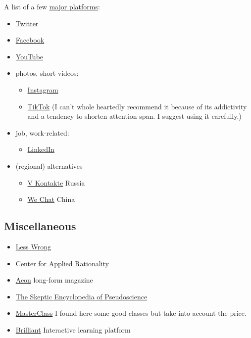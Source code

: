 \documentclass{article}
\begin{document}
A list of a few \href{https://www.visualcapitalist.com/ranked-social-networks-worldwide-by-users/}{major platforms}:
\begin{itemize}
    \item \href{https://twitter.com/?lang=en}{Twitter}
    \item \href{https://www.facebook.com/}{Facebook}
    \item \href{https://www.youtube.com/}{YouTube}
    \item photos, short videos:
    \begin{itemize}
        \item \href{https://www.instagram.com/?hl=en}{Instagram}
        \item \href{https://www.tiktok.com/en/}{TikTok} (I can't whole heartedly recommend it because of its addictivity and a tendency to shorten attention span. I suggest using it carefully.)
    \end{itemize}
    \item job, work-related:
    \begin{itemize}
        \item \href{https://www.linkedin.com/}{LinkedIn}
    \end{itemize}
    \item (regional) alternatives
    \begin{itemize}
        \item \href{https://vk.com/?lang=en}{V Kontakte} Russia
        \item \href{https://www.wechat.com/}{We Chat} China
    \end{itemize}
\end{itemize}


\subsection{Miscellaneous}

\begin{itemize}
    \item \href{https://www.lesswrong.com/}{Less Wrong}
    \item \href{https://rationality.org/}{Center for Applied Rationality}
    \item \href{https://aeon.co/}{Aeon} long-form magazine
    \item \href{https://www.goodreads.com/book/show/656073.The_Skeptic_Encyclopedia_of_Pseudoscience}{The Skeptic Encyclopedia of Pseudoscience}
    \item \href{https://www.masterclass.com/}{MasterClass} I found here some good classes but take into account the price.
    \item \href{https://brilliant.org/}{Brilliant} Interactive learning platform
\end{itemize}
\end{document}
